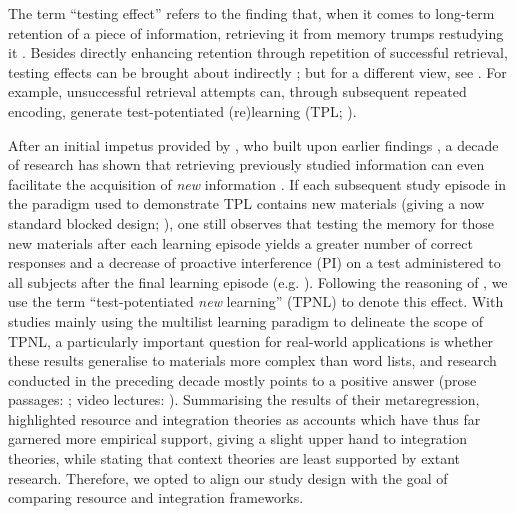 \documentclass[../main.tex]{subfiles}
\begin{document}
The term ``testing effect'' refers to the finding that, when it comes to 
long-term retention of a piece of information, retrieving it from memory 
trumps restudying it 
\citep{karpickeCriticalImportanceRetrieval2008,roedigeriiiPowerTestingMemory2006,
 roedigeriiiTestEnhancedLearningTaking2006, rowlandEffectTestingRestudy2014, 
adesopeRethinkingUseTests2017, roedigeriiiCriticalRoleRetrieval2011, 
gloverTestingPhenomenonNot1989}. Besides directly enhancing retention 
through repetition of successful retrieval, testing effects can be brought 
about indirectly \citealp{arnoldTestpotentiatedLearningDistinguishing2013, 
roedigeriiiPowerTestingMemory2006}; but for a different view, see 
\citealp{kornellRetrievalAttemptsEnhance2015}. For example, unsuccessful 
retrieval attempts can, through subsequent repeated encoding, generate 
test-potentiated (re)learning (TPL;
\citealp{izawaReinforcementTestSequencesPairedAssociate1966,izawaOptimalPotentiatingEffects1970,
 kornellUnsuccessfulRetrievalAttempts2009, arnoldFreeRecallEnhances2013, 
arnoldTestpotentiatedLearningDistinguishing2013, 
wissmanTestpotentiatedLearningThree2018}).

After an initial impetus provided by 
\cite{szpunarTestingStudyInsulates2008}, who built upon earlier findings 
\citep{darleyEffectsPriorFree1971, tulvingNegativeTransferEffects1974}, a 
decade of research has shown that retrieving previously studied information 
can even facilitate the acquisition of \textit{new} information 
\cite{chanRetrievalPotentiatesNew2018, 
pastotterRetrievalPracticeEnhances2014, yangEnhancingLearningRetrieval2018}. 
If each subsequent study episode in the paradigm used to demonstrate TPL 
contains new materials (giving a now standard blocked design; 
\citealp{chanTestingPotentiatesNew2018}), one still observes that testing 
the memory for those new materials after each learning episode yields a 
greater number of correct responses and a decrease of proactive interference 
(PI) on a test administered to all subjects after the final learning episode 
(e.g. \citealp{szpunarInterpolatedMemoryTests2013, 
szpunarTestingStudyInsulates2008, wissmanInterimTestEffect2011}). Following 
the reasoning of \cite{chanRetrievalPotentiatesNew2018}, we use the term 
``test-potentiated \textit{new} learning'' (TPNL) to denote this effect.
With studies mainly using the multilist learning paradigm to delineate the 
scope of TPNL, a particularly important question for real-world applications 
is whether these results generalise to materials more complex than word 
lists, and research conducted in the preceding decade mostly points to a 
positive answer (prose passages: \citealp{wissmanInterimTestEffect2011, 
divisRetrievalSpeedsContext2014}; video lectures: 
\citealp{szpunarInterpolatedMemoryTests2013, 
jingInterpolatedTestingInfluences2016}). Summarising the results of their 
metaregression, \cite{chanRetrievalPotentiatesNew2018} highlighted resource 
and integration theories as accounts which have thus far garnered more 
empirical support, giving a slight upper hand to integration theories, while 
stating that context theories are least supported by extant research. 
Therefore, we opted to align our study design with the goal of comparing 
resource and integration frameworks.
\end{document}
